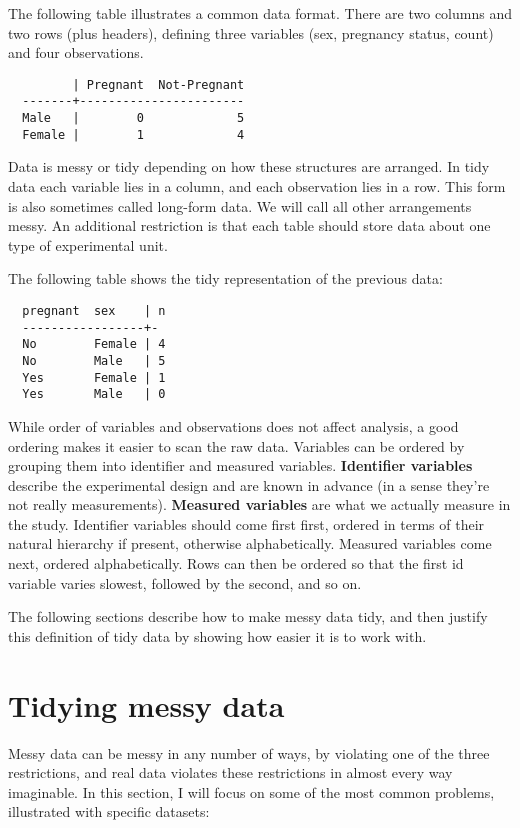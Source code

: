 \documentclass[oneside]{article}
\begin{document}
The following table illustrates a common data format. There are two columns and two rows (plus headers), defining three variables (sex, pregnancy status, count) and four observations.

\begin{verbatim}
         | Pregnant  Not-Pregnant
  -------+-----------------------
  Male   |        0             5
  Female |        1             4
\end{verbatim}

Data is messy or tidy depending on how these structures are arranged. In tidy data each variable lies in a column, and each observation lies in a row. This form is also sometimes called long-form data. We will call all other arrangements messy.  An additional restriction is that each table should store data about one type of experimental unit.

The following table shows the tidy representation of the previous data:

\begin{verbatim}
  pregnant  sex    | n
  -----------------+-
  No        Female | 4
  No        Male   | 5
  Yes       Female | 1
  Yes       Male   | 0
\end{verbatim}

While order of variables and observations does not affect analysis, a good ordering makes it easier to scan the raw data. Variables can be ordered by grouping them into identifier and measured variables. \textbf{Identifier variables} describe the experimental design and are known in advance (in a sense they're not really measurements). \textbf{Measured variables} are what we actually measure in the study. Identifier variables should come first first, ordered in terms of their natural hierarchy if present, otherwise alphabetically. Measured variables come next, ordered alphabetically. Rows can then be ordered so that the first id variable varies slowest, followed by the second, and so on.

The following sections describe how to make messy data tidy, and then justify this definition of tidy data by showing how easier it is to work with.

\section{Tidying messy data}

Messy data can be messy in any number of ways, by violating one of the three restrictions, and real data violates these restrictions in almost every way imaginable. In this section, I will focus on some of the most common problems, illustrated with specific datasets:
\end{document}
